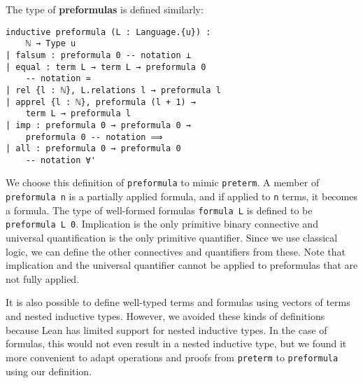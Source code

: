 \documentclass[sigplan,10pt,review]{acmart}
\newcommand{\lil}{\lstinline}
\theoremstyle{definition}
\begin{document}
The type of \textbf{preformulas} is defined similarly:
\begin{lstlisting}
inductive preformula (L : Language.{u}) :
    ℕ → Type u
| falsum : preformula 0 -- notation ⊥
| equal : term L → term L → preformula 0
    -- notation ≃
| rel {l : ℕ}, L.relations l → preformula l
| apprel {l : ℕ}, preformula (l + 1) →
    term L → preformula l
| imp : preformula 0 → preformula 0 →
    preformula 0 -- notation ⟹
| all : preformula 0 → preformula 0
    -- notation ∀'
\end{lstlisting}
We choose this definition of \lil{preformula} to mimic \lil{preterm}.
A member of \lil{preformula n} is a partially applied formula, and if applied to \lil{n} terms, it becomes a formula.
The type of well-formed formulas \lil{formula L} is defined to be \lil{preformula L 0}.
Implication is the only primitive binary connective and universal quantification is the only primitive quantifier. Since we use classical logic, we can define the other connectives and quantifiers from these.
Note that implication and the universal quantifier cannot be applied to preformulas that are not fully applied.

It is also possible to define well-typed terms and formulas using vectors of terms and nested inductive types. However, we avoided these kinds of definitions because Lean has limited support for nested inductive types. In the case of formulas, this would not even result in a nested inductive type, but we found it more convenient to adapt operations and proofs from \lil{preterm} to \lil{preformula} using our definition.
\end{document}
